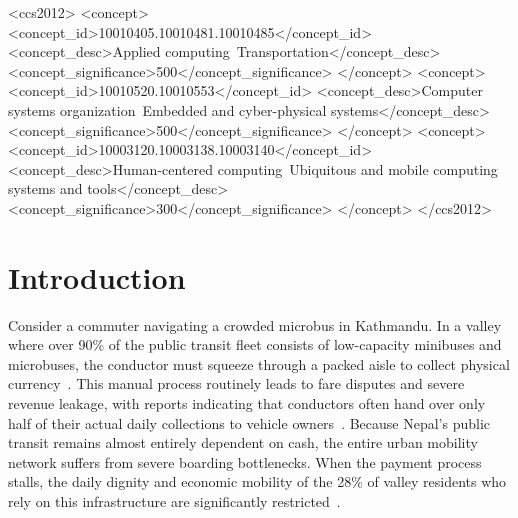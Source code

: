 \documentclass[manuscript,review,anonymous]{acmart}
\begin{document}
\begin{CCSXML}
  <ccs2012>
     <concept>
         <concept_id>10010405.10010481.10010485</concept_id>
         <concept_desc>Applied computing~Transportation</concept_desc>
         <concept_significance>500</concept_significance>
         </concept>
     <concept>
         <concept_id>10010520.10010553</concept_id>
         <concept_desc>Computer systems organization~Embedded and cyber-physical systems</concept_desc>
         <concept_significance>500</concept_significance>
         </concept>
     <concept>
         <concept_id>10003120.10003138.10003140</concept_id>
         <concept_desc>Human-centered computing~Ubiquitous and mobile computing systems and tools</concept_desc>
         <concept_significance>300</concept_significance>
         </concept>
   </ccs2012>
\end{CCSXML}
  




\maketitle

\section{Introduction}
Consider a commuter navigating a crowded microbus in Kathmandu. In a valley where over 90\% of the public transit fleet consists of low-capacity minibuses and microbuses, the conductor must squeeze through a packed aisle to collect physical currency~\cite{jica2017kathmandu_transport,aryal2022strong}. This manual process routinely leads to fare disputes and severe revenue leakage, with reports indicating that conductors often hand over only half of their actual daily collections to vehicle owners~\cite{annapurnaexpress2026article}. Because Nepal's public transit remains almost entirely dependent on cash, the entire urban mobility network suffers from severe boarding bottlenecks. When the payment process stalls, the daily dignity and economic mobility of the 28\% of valley residents who rely on this infrastructure are significantly restricted~\cite{jica2017kathmandu_transport}.
\end{document}
